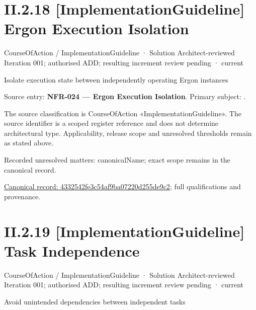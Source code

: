 \section*{II.2.18 [ImplementationGuideline] Ergon Execution Isolation}
\label{navigation:II.2.18}

\label{element:4332542fe3c54af9ba07220d255de9c2}
{\small CourseOfAction / ImplementationGuideline · Solution Architect-reviewed Iteration 001; authorised ADD; resulting increment review pending · current}\par

Isolate execution state between independently operating Ergon instances



Source entry: \textbf{NFR-024 — Ergon Execution Isolation}. Primary subject: \texttt{}.



The source classification is CourseOfAction «ImplementationGuideline». The source identifier is a scoped register reference and does not determine architectural type. Applicability, release scope and unresolved thresholds remain as stated above.


{\small Recorded unresolved matters: canonicalName; exact scope remains in the canonical record.}\par
{\footnotesize \href{../../../../../../../continuum/strategy/course-of-action/implementation-guideline/4332542fe3c54af9ba07220d255de9c2.md}{Canonical record: 4332542fe3c54af9ba07220d255de9c2}; full qualifications and provenance.}\par
\section*{II.2.19 [ImplementationGuideline] Task Independence}
\label{navigation:II.2.19}

\label{element:80fe052799944843917044749288f297}
{\small CourseOfAction / ImplementationGuideline · Solution Architect-reviewed Iteration 001; authorised ADD; resulting increment review pending · current}\par

Avoid unintended dependencies between independent tasks



